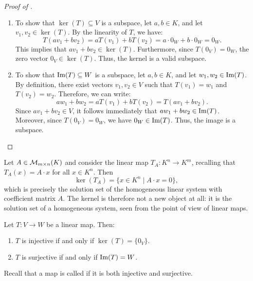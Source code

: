 \begin{proof}[Proof of ]
\begin{enumerate}[label=\textbf{(\alph*)}]
    \item To show that $\ker(T) \subseteq V$ is a subspace, let $a, b \in K$, and let $v_1, v_2 \in \ker(T)$. By the linearity of $T$, we have:
    \[
    T(a v_1 + b v_2) = a T(v_1) + b T(v_2) = a \cdot 0_W + b \cdot 0_W = 0_W.
    \]
    This implies that $a v_1 + b v_2 \in \ker(T)$. Furthermore, since $T(0_V) = 0_W$, the zero vector $0_V \in \ker(T)$. Thus, the kernel is a valid subspace.
    
    \item To show that $\operatorname{Im}(T) \subseteq W$ is a subspace, let $a, b \in K$, and let $w_1, w_2 \in \operatorname{Im}(T)$. By definition, there exist vectors $v_1, v_2 \in V$ such that $T(v_1) = w_1$ and $T(v_2) = w_2$. Therefore, we can write:
    \[
    a w_1 + b w_2 = a T(v_1) + b T(v_2) = T(a v_1 + b v_2).
    \]
    Since $a v_1 + b v_2 \in V$, it follows immediately that $a w_1 + b w_2 \in \operatorname{Im}(T)$. Moreover, since $T(0_V) = 0_W$, we have $0_W \in \operatorname{Im}(T)$. Thus, the image is a subspace.
\end{enumerate}
\end{proof}

\begin{example}
\label{ex:kernel_of_T_A}
Let $A \in \mathcal{M}_{m \times n}(K)$ and consider the linear map $T_A: K^n \to K^m$, recalling that $T_A(x) = A \cdot x$ for all $x \in K^n$. Then
\[
\ker(T_A) = \{x \in K^n \mid A \cdot x = 0\},
\]
which is precisely the solution set of the homogeneous linear system with coefficient matrix $A$. The kernel is therefore not a new object at all: it is the solution set of a homogeneous system, seen from the point of view of linear maps.
\end{example}

\begin{proposition}
\label{prop:injectivity_kernel}
Let $T: V \to W$ be a linear map. Then:
\begin{enumerate}[label=\textbf{(\alph*)}]
    \item $T$ is injective if and only if $\ker(T) = \{0_V\}$.
    \item $T$ is surjective if and only if $\operatorname{Im}(T) = W$.
\end{enumerate}
Recall that a map is called  if it is both injective and surjective.
\end{proposition}

